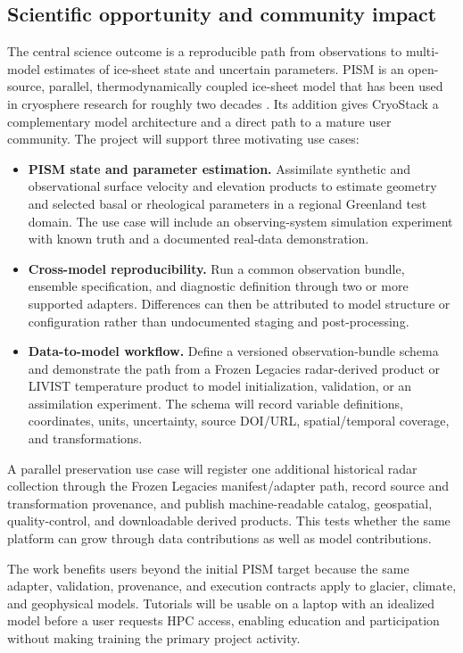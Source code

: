 \subsection{Scientific opportunity and community impact}

The central science outcome is a reproducible path from observations to
multi-model estimates of ice-sheet state and uncertain parameters. PISM is an
open-source, parallel, thermodynamically coupled ice-sheet model that has been
used in cryosphere research for roughly two decades \citep{pism2026}. Its
addition gives CryoStack a complementary model architecture and a direct path
to a mature user community. The project will support three motivating use
cases:

\begin{itemize}[leftmargin=*]
  \item \textbf{PISM state and parameter estimation.} Assimilate synthetic
  and observational surface velocity and elevation products to estimate geometry
  and selected basal or rheological parameters in a regional Greenland test
  domain. The use case will include an observing-system simulation experiment
  with known truth and a documented real-data demonstration.
  \item \textbf{Cross-model reproducibility.} Run a common observation bundle,
  ensemble specification, and diagnostic definition through two or more
  supported adapters. Differences can then be attributed to model structure
  or configuration rather than undocumented staging and post-processing.
  \item \textbf{Data-to-model workflow.} Define a versioned observation-bundle
  schema and demonstrate the path from a Frozen Legacies radar-derived product
  or LIVIST temperature product to model initialization, validation, or an
  assimilation experiment.
  The schema will record variable definitions, coordinates, units,
  uncertainty, source DOI/URL, spatial/temporal coverage, and transformations.
\end{itemize}

A parallel preservation use case will register one additional historical
radar collection through the Frozen Legacies manifest/adapter path, record
source and transformation provenance, and publish machine-readable catalog,
geospatial, quality-control, and downloadable derived products. This tests
whether the same platform can grow through data contributions as well as model
contributions.

The work benefits users beyond the initial PISM target because the same
adapter, validation, provenance, and execution contracts apply to glacier,
climate, and geophysical models. Tutorials will be usable on a laptop with an
idealized model before a user requests HPC access, enabling education and
participation without making training the primary project activity.

